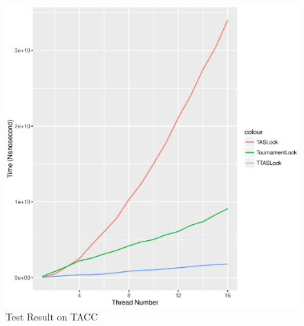 \documentclass[a4paper]{report}
\begin{document}


\begin{figure}[H]
  \includegraphics[scale=0.8]{result-tacc-7654044}
  \caption{Test Result on TACC}
\end{figure}
\end{document}
